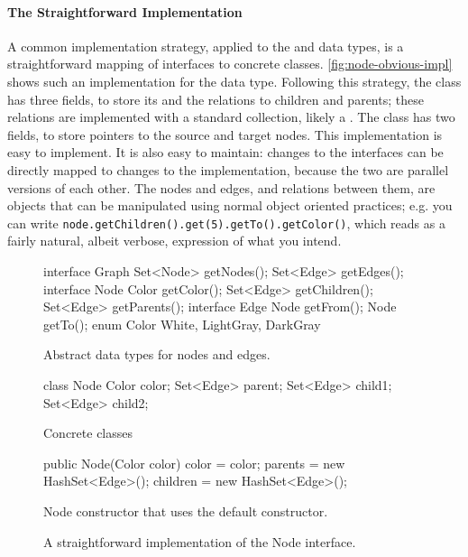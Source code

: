 \paragraph{The Straightforward Implementation}
A common implementation strategy, applied to the  and 
data types, is a straightforward mapping of interfaces to concrete classes.
\autoref{fig:node-obvious-impl} shows such an implementation for the
 data type. Following this strategy, the  class has
three fields, to store its  and the relations to children and
parents; these relations are implemented with a standard collection, likely a
. The  class has two fields, to store pointers to the
source and target nodes. This implementation is easy to implement. It is also
easy to maintain: changes to the interfaces can be directly mapped to changes to
the implementation, because the two are parallel versions of each other. The
nodes and edges, and relations between them, are objects that can be manipulated
using normal object oriented practices; e.g. you can write
\texttt{node.getChildren().get(5).getTo()\-.getColor()}, which reads as a fairly
natural, albeit verbose, expression of what you intend.

\begin{figure}
\centering
\begin{figurelisting}
interface Graph {
	Set<Node> getNodes();
	Set<Edge> getEdges();
}
interface Node {
	Color getColor();
	Set<Edge> getChildren();
	Set<Edge> getParents();
}
interface Edge {
	Node getFrom();
	Node getTo();
}
enum Color {
	White, LightGray, DarkGray
}
\end{figurelisting}
\caption{Abstract data types for nodes and edges.}
\label{fig:graph-interfaces}
\end{figure}

\begin{figure}
\centering
\begin{subfloat}
\begin{minipage}[b]{0.3\textwidth}
\begin{figurelisting}
class Node {
   Color color;
   Set<Edge> parent;
   Set<Edge> child1;
   Set<Edge> child2;
}
\end{figurelisting}
\end{minipage}
\caption{Concrete classes}
\end{subfloat}
\quad
\begin{subfloat}
\begin{minipage}[b]{0.5\textwidth}
\begin{figurelisting}
public Node(Color color) {
   color = color;
   parents = new HashSet<Edge>();
   children = new HashSet<Edge>();
}
\end{figurelisting}
\end{minipage}
\caption{Node constructor that uses the default  constructor.}
\label{fig:node-obvious-constructor}
\end{subfloat}
\caption{A straightforward implementation of the Node interface.}
\label{fig:node-obvious-impl}
\end{figure}


